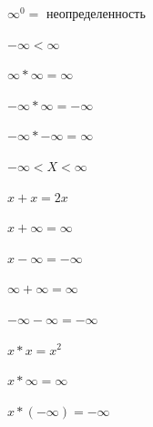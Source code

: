 $\infty^0 =$ неопределенность

$-\infty < \infty$

$\infty * \infty = \infty$

$-\infty * \infty = -\infty$

$-\infty * -\infty = \infty$

$-\infty < X < \infty$

$x + x = 2x$

$x + \infty = \infty$

$x - \infty = - \infty$

$\infty + \infty = \infty$

$-\infty - \infty = -\infty$

$x * x = x^2$

$x * \infty = \infty$

$x * (-\infty) = -\infty$
\newpage

